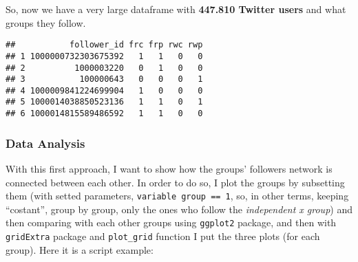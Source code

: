 \documentclass[
]{article}
\begin{document}
So, now we have a very large dataframe with \textbf{447.810 Twitter
users} and what groups they follow.

\begin{verbatim}
##           follower_id frc frp rwc rwp
## 1 1000000732303675392   1   1   0   0
## 2          1000003220   0   1   0   0
## 3           100000643   0   0   0   1
## 4 1000009841224699904   1   0   0   0
## 5 1000014038850523136   1   1   0   1
## 6 1000014815589486592   1   1   0   0
\end{verbatim}

\hypertarget{data-analysis}{%
\subsubsection{Data Analysis}\label{data-analysis}}

With this first approach, I want to show how the groups' followers
network is connected between each other. In order to do so, I plot the
groups by subsetting them (with setted parameters,
\texttt{variable\ group\ ==\ 1}, so, in other terms, keeping
``costant'', group by group, only the ones who follow the
\emph{independent x group}) and then comparing with each other groups
using \texttt{ggplot2} package, and then with \texttt{gridExtra} package
and \texttt{plot\_grid} function I put the three plots (for each group).
Here it is a script example:
\end{document}
